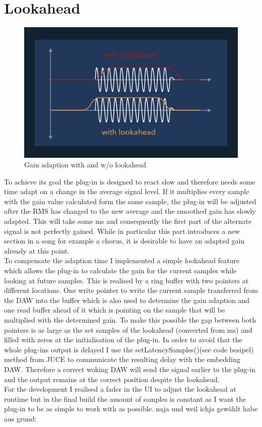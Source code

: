 \section{Lookahead}

\begin{figure}[H]
\includegraphics[width=\textwidth]{images/lookahead_w_o}
\caption{Gain adaption with and w/o lookahead}
\end{figure}

To achieve its goal the plug-in is designed to react slow and therefore needs some time adapt on a change in the average signal level. If it multiplies every sample with the gain value calculated form the same sample, the plug-in will be adjusted after the RMS has changed to the new average and the smoothed gain has slowly adapted. This will take some ms and consequently the first part of the alternate signal is not perfectly gained. While in particular this part introduces a new section in a song for example a chorus, it is desirable to have an adapted gain already at this point.\\
To compensate the adaption time I implemented a simple lookahead feature which allows the plug-in to calculate the gain for the current samples while looking at future samples.  This is realised by a ring buffer with two pointers at different locations. One write pointer to write the current sample transferred from the DAW into the buffer which is also used to determine the gain adaption and one read buffer ahead of it which is pointing on the sample that will be multiplied with the determined gain. To make this possible the gap between both pointers is as large as the set samples of the lookahead (converted from ms) and filled with zeros at the initialisation of the plug-in. In order to avoid that the whole plug-ins output is delayed I use the setLatencySamples()(see code besipel) method from JUCE to  communicate the resulting delay with the embedding DAW. Therefore a correct woking DAW will send the signal earlier to the plug-in and the output remains at the correct position despite the lookahead.\\
For the development I realised a fader in the UI to adjust the lookahead at runtime but in the final build the amount of samples is constant as I want the plug-in to be as simple to work with as possible. naja und weil ichja gewählt habe aus grund:


